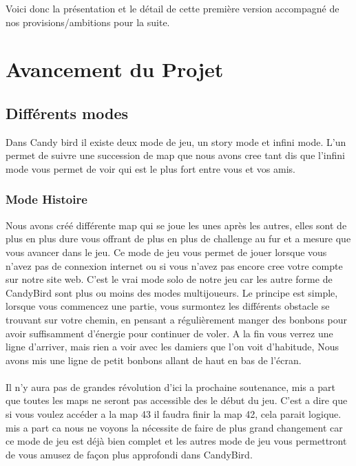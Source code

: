 \documentclass [11pt]{report}
\begin{document}
Voici donc la présentation et le détail de cette première version accompagné de nos provisions/ambitions pour la suite.




\chapter{Avancement du Projet}
	\section{Différents modes}
	Dans Candy bird il existe deux mode de jeu, un story mode et infini mode. L'un permet de suivre une succession de map que nous avons cree tant dis que l'infini mode vous permet de voir qui est le plus fort entre vous et vos amis.
	
	\vspace{10mm}
	
		\subsection{Mode Histoire}	
		Nous avons créé différente map qui se joue les unes après les autres, elles sont de plus en plus dure vous  offrant de plus en plus de challenge au fur et a mesure que vous avancer dans le jeu. Ce mode de jeu vous permet de jouer lorsque vous n'avez pas de connexion internet ou si vous n'avez pas encore cree votre compte sur notre site web. C'est le vrai mode solo de notre jeu car les autre forme de CandyBird sont plus ou moins des modes multijoueurs. Le principe est simple, lorsque vous commencez une partie, vous surmontez les différents obstacle se trouvant sur votre chemin, en pensant a régulièrement manger des bonbons pour avoir suffisamment d'énergie pour continuer de voler. A la fin vous verrez une ligne d'arriver, mais rien a voir avec les damiers que l'on voit d'habitude, Nous avons mis une ligne de petit bonbons allant de haut en bas de l'écran.\\
		\\
		\indent
		Il n'y aura pas de grandes révolution d'ici la prochaine soutenance, mis a part que toutes les maps ne seront pas accessible des le début du jeu. C'est a dire que si vous voulez accéder a la map 43 il faudra finir la map 42, cela parait logique. mis a part ca nous ne voyons la nécessite de faire de plus grand changement car ce mode de jeu est déjà bien complet et les autres mode de jeu vous permettront de vous amusez de façon plus approfondi dans CandyBird.
		
\end{document}
